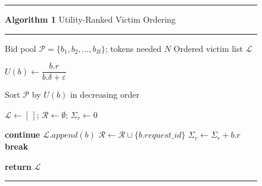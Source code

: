 \begin{figure}[!t]
\centering
\footnotesize
\begin{minipage}{\columnwidth}
\hrule
\vspace{0.5ex}
\textbf{Algorithm 1} Utility-Ranked Victim Ordering
\par\vspace{0.5ex}
\hrule
\vspace{0.8ex}

\begin{algorithmic}[1]
\Require Bid pool $\mathcal{P}=\{b_1,b_2,\ldots,b_B\}$; tokens needed $N$
\Ensure Ordered victim list $\mathcal{L}$

  \State $U(b)\gets \dfrac{b.r}{b.\delta+\varepsilon}$ 
\EndFor

\State Sort $\mathcal{P}$ by $U(b)$ in decreasing order

\State $\mathcal{L}\gets[\,]$; $\mathcal{R}\gets\emptyset$; $\Sigma_r\gets 0$ 

    \State \textbf{continue} 
  \EndIf
  \State $\mathcal{L}.\textit{append}(b)$
  \State $\mathcal{R}\gets\mathcal{R}\cup\{b.\textit{request\_id}\}$
  \State $\Sigma_r\gets\Sigma_r+b.r$
    \State \textbf{break} 
  \EndIf
\EndFor

\State \textbf{return} $\mathcal{L}$ 
\end{algorithmic}

\vspace{0.6ex}
\hrule
\end{minipage}
\label{alg:greedy}
\vspace{-0.4em}
\end{figure}